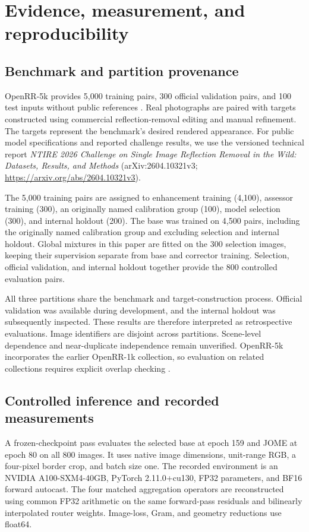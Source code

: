 \documentclass[12pt]{article}
\begin{document}
\section{Evidence, measurement, and reproducibility}
\label{sec:protocol}
\subsection{Benchmark and partition provenance}
OpenRR-5k provides 5,000 training pairs, 300 official validation pairs, and 100 test inputs without public references \citep{cai2025openrr}. Real photographs are paired with targets constructed using commercial reflection-removal editing and manual refinement. The targets represent the benchmark's desired rendered appearance. For public model specifications and reported challenge results, we use the versioned technical report \emph{NTIRE 2026 Challenge on Single Image Reflection Removal in the Wild: Datasets, Results, and Methods} (arXiv:2604.10321v3; \url{https://arxiv.org/abs/2604.10321v3}).

The 5,000 training pairs are assigned to enhancement training (4,100), assessor training (300), an originally named calibration group (100), model selection (300), and internal holdout (200). The base was trained on 4,500 pairs, including the originally named calibration group and excluding selection and internal holdout. Global mixtures in this paper are fitted on the 300 selection images, keeping their supervision separate from base and corrector training. Selection, official validation, and internal holdout together provide the 800 controlled evaluation pairs.

All three partitions share the benchmark and target-construction process. Official validation was available during development, and the internal holdout was subsequently inspected. These results are therefore interpreted as retrospective evaluations. Image identifiers are disjoint across partitions. Scene-level dependence and near-duplicate independence remain unverified. OpenRR-5k incorporates the earlier OpenRR-1k collection, so evaluation on related collections requires explicit overlap checking \citep{cai2025openrr}.

\subsection{Controlled inference and recorded measurements}
A frozen-checkpoint pass evaluates the selected base at epoch 159 and JOME at epoch 80 on all 800 images. It uses native image dimensions, unit-range RGB, a four-pixel border crop, and batch size one. The recorded environment is an NVIDIA A100-SXM4-40GB, PyTorch 2.11.0+cu130, FP32 parameters, and BF16 forward autocast. The four matched aggregation operators are reconstructed using common FP32 arithmetic on the same forward-pass residuals and bilinearly interpolated router weights. Image-loss, Gram, and geometry reductions use float64.
\end{document}
